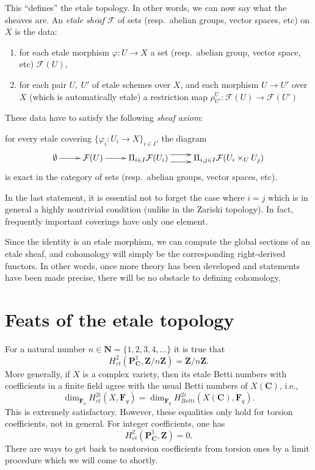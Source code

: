 \noindent
This ``defines'' the etale topology. In other words, we can now say what the
sheaves are. An {\it etale sheaf} $\mathcal{F}$ of sets
(resp.\ abelian groups, vector spaces, etc) on $X$ is the data:
\begin{enumerate}
\item for each etale morphism $\varphi : U \to X$ a set
(resp.\ abelian group, vector space, etc) $\mathcal{F}(U)$,
\item for each pair $U, \ U'$ of etale schemes over $X$,
and each morphism $U \to U'$ over $X$ (which is
automatically etale) a restriction map $\rho^{U}_{U'}
: \mathcal{F}(U) \to \mathcal{F}(U')$
\end{enumerate}
These data have to satisfy the following {\it sheaf axiom}:
\begin{list}{(*)}{}
\item for every etale covering $\{ \varphi_i : U_i \to X\}_{i \in
I}$, the diagram
$$
\xymatrix{
\emptyset \ar[r] &
\mathcal{F} (U) \ar[r] &
\Pi_{i \in I} \mathcal{F} (U_i) \ar@<1ex>[r] \ar@<-1ex>[r] &
\Pi_{i,j \in I} \mathcal{F} (U_i \times_U U_j)
}
$$
is exact in the category of sets (resp.\ abelian groups, vector spaces, etc).
\end{list}

\begin{remark}
\label{remark-i-is-j}
In the last statement, it is essential not to forget the case where $i = j$
which is in general a highly nontrivial condition (unlike in the Zariski
topology). In fact, frequently important coverings have only one element.
\end{remark}

\noindent
Since the identity is an etale morphism, we can compute the global sections
of an etale sheaf, and cohomology will simply be the corresponding
right-derived functors. In other words, once more theory has been developed and
statements have been made precise, there will be no obstacle to defining
cohomology.




\section{Feats of the etale topology}
\label{section-feats}

\noindent
For a natural number $n \in \mathbf{N} = \{1, 2, 3, 4, \dots\}$ it is true that
$$
H_{et}^2 (\mathbf{P}^1_\mathbf{C}, \mathbf{Z}/n\mathbf{Z}) =
\mathbf{Z}/n\mathbf{Z}.
$$
More generally, if $X$ is a complex variety, then its etale Betti numbers
with coefficients in a finite field agree with the usual Betti numbers of
$X(\mathbf{C})$, i.e.,
$$
\dim_{\mathbf{F}_q} H_{et}^{2i} (X, \mathbf{F}_q) = \dim_{\mathbf{F}_q}
H_{Betti}^{2i} (X(\mathbf{C}), \mathbf{F}_q).
$$
This is extremely satisfactory. However, these equalities only hold for torsion
coefficients, not in general. For integer coefficients, one has
$$
H_{et}^2 (\mathbf{P}^1_\mathbf{C}, \mathbf{Z}) = 0.
$$
There are ways to get back to nontorsion coefficients from torsion ones by a
limit procedure which we will come to shortly.




